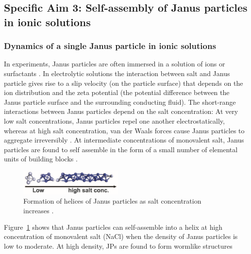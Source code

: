 \subsection{Specific Aim 3: Self-assembly of Janus particles in ionic solutions}
\label{subsec:specific_aim_3}

\subsubsection{Dynamics of a single Janus particle in ionic solutions}
In experiments, Janus particles are often immersed in a solution of ions \cite{ChenWhitmer2011_Sci} or surfactants \cite{}.
In electrolytic solutions the interaction between salt and Janus particle gives 
rise to a slip velocity (on the particle surface) that depends on the ion distribution and the zeta potential \cite{BayatiJCP2016} 
(the potential difference between the Janus particle surface and the surrounding conducting fluid).
The short-range interactions between Janus particles depend on the salt concentration:
At very low salt concentrations, Janus particles repel one another electrostatically, whereas at high salt concentration, van der Waals
forces cause Janus particles to aggregate irreversibly \cite{Goodwin2019}. At intermediate concentrations of monovalent salt, Janus particles are found to self assemble in the form of a small number of elemental units of building blocks \cite{Chen2011_Science}. 
%
\begin{figure}
\centerline{\includegraphics[width=0.46\textwidth]{Figures/fig2A_Chen2011_Science}}
  \vspace{-5pt}
\caption{\label{fig:helices_of_JPs} \footnotesize Formation of helices of Janus particles as salt concentration increases \cite{Chen2011_Science}.}
\end{figure}
%
Figure~\ref{fig:helices_of_JPs} shows that Janus particles can self-assemble into a helix at high concentration of monovalent salt (NaCl) when the density of Janus particles is low to moderate. At high density, JPs are found to form wormlike structures

